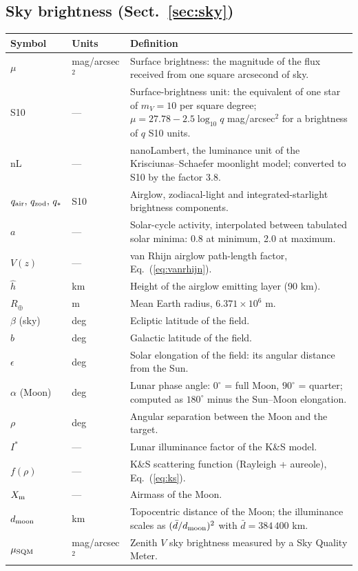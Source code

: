 \subsection*{Sky brightness (Sect.~\ref{sec:sky})}

\begin{tabular}{llp{8.6cm}}
\toprule
Symbol & Units & Definition \\
\midrule
$\mu$ & mag/arcsec$^2$ & Surface brightness: the magnitude of the flux
  received from one square arcsecond of sky. \\
S10 & — & Surface-brightness unit: the equivalent of one star of
  $m_V = 10$ per square degree;
  $\mu = 27.78 - 2.5\log_{10} q$ mag/arcsec$^2$ for a brightness of $q$
  S10 units. \\
nL & — & nanoLambert, the luminance unit of the Krisciunas--Schaefer
  moonlight model; converted to S10 by the factor 3.8. \\
$q_{\rm air},\,q_{\rm zod},\,q_\ast$ & S10 & Airglow, zodiacal-light and
  integrated-starlight brightness components. \\
$a$ & — & Solar-cycle activity, interpolated between tabulated solar
  minima: 0.8 at minimum, 2.0 at maximum. \\
$V(z)$ & — & van Rhijn airglow path-length factor,
  Eq.~(\ref{eq:vanrhijn}). \\
$\hat h$ & km & Height of the airglow emitting layer (90 km). \\
$R_\oplus$ & m & Mean Earth radius, $6.371\times10^6$ m. \\
$\beta$ (sky) & deg & Ecliptic latitude of the field. \\
$b$ & deg & Galactic latitude of the field. \\
$\epsilon$ & deg & Solar elongation of the field: its angular distance
  from the Sun. \\
$\alpha$ (Moon) & deg & Lunar phase angle: $0^\circ$ = full Moon,
  $90^\circ$ = quarter; computed as $180^\circ$ minus the Sun--Moon
  elongation. \\
$\rho$ & deg & Angular separation between the Moon and the target. \\
$I^\ast$ & — & Lunar illuminance factor of the K\&S model. \\
$f(\rho)$ & — & K\&S scattering function (Rayleigh + aureole),
  Eq.~(\ref{eq:ks}). \\
$X_{\rm m}$ & — & Airmass of the Moon. \\
$d_{\rm moon}$ & km & Topocentric distance of the Moon; the illuminance
  scales as $(\bar d/d_{\rm moon})^2$ with $\bar d = 384\,400$ km. \\
$\mu_{\rm SQM}$ & mag/arcsec$^2$ & Zenith $V$ sky brightness measured by
  a Sky Quality Meter. \\
\bottomrule
\end{tabular}

